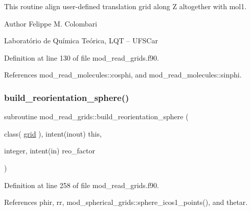This routine align user-\/defined translation grid along Z altogether with mol1. 

\begin{DoxyAuthor}{Author}
Felippe M. Colombari
\begin{DoxyItemize}
\item Laboratório de Química Teórica, L\+QT -- U\+F\+S\+Car 
\end{DoxyItemize}
\end{DoxyAuthor}


Definition at line 130 of file mod\+\_\+read\+\_\+grids.\+f90.



References mod\+\_\+read\+\_\+molecules\+::cosphi, and mod\+\_\+read\+\_\+molecules\+::sinphi.

\mbox{\label{namespacemod__read__grids_aa9f66d2873344e2a319f7eddb09df558}} 
\subsubsection{\texorpdfstring{build\+\_\+reorientation\+\_\+sphere()}{build\_reorientation\_sphere()}}
{\footnotesize\ttfamily subroutine mod\+\_\+read\+\_\+grids\+::build\+\_\+reorientation\+\_\+sphere (\begin{DoxyParamCaption}\item[{class( \hyperlink{structmod__read__grids_1_1grid}{grid} ), intent(inout)}]{this,  }\item[{integer, intent(in)}]{reo\+\_\+factor }\end{DoxyParamCaption})}



Definition at line 258 of file mod\+\_\+read\+\_\+grids.\+f90.



References phir, rr, mod\+\_\+spherical\+\_\+grids\+::sphere\+\_\+icos1\+\_\+points(), and thetar.

